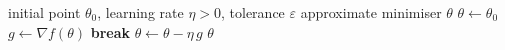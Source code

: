 \documentclass{article}
\begin{document}
\begin{algorithm}[htbp]
  \caption{Gradient descent with early stopping}
  \label{alg:gd}
  \begin{algorithmic}[1]
    \Require initial point $\theta_0$, learning rate $\eta > 0$, tolerance $\varepsilon$
    \Ensure approximate minimiser $\theta$
    \State $\theta \gets \theta_0$
      \State $g \gets \nabla f(\theta)$
        \State \textbf{break}
      \EndIf
      \State $\theta \gets \theta - \eta\, g$
    \EndFor
    \State \Return $\theta$
  \end{algorithmic}
\end{algorithm}
\end{document}
